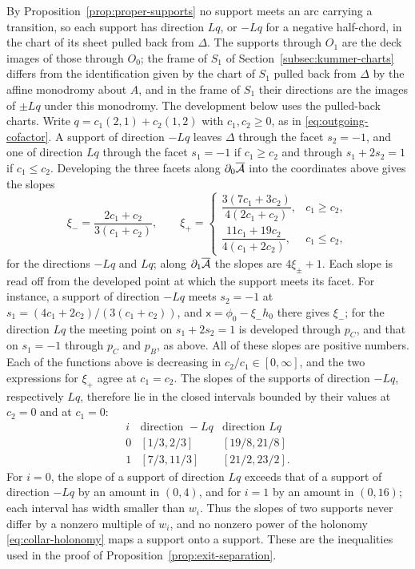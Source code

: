 By Proposition~\ref{prop:proper-supports} no support meets an arc carrying a
transition, so each support has direction $Lq$, or $-Lq$ for a negative
half-chord, in the chart of its sheet pulled back from $\Delta$.  The
supports through $O_1$ are the deck images of those through $O_0$; the frame
of $S_1$ of Section~\ref{subsec:kummer-charts} differs from the
identification given by the chart of $S_1$ pulled back from $\Delta$ by the
affine monodromy about $A$, and in the frame of $S_1$ their directions are
the images of $\pm Lq$ under this monodromy.  The
development below uses the pulled-back charts.  Write $q=c_1(2,1)+c_2(1,2)$ with
$c_1,c_2\geq0$, as in \eqref{eq:outgoing-cofactor}.  A support of
direction $-Lq$ leaves $\Delta$ through the facet $s_2=-1$, and one of
direction $Lq$ through the facet $s_1=-1$ if $c_1\geq c_2$ and through
$s_1+2s_2=1$ if $c_1\leq c_2$.  Developing the three facets along
$\partial_0\overline{\mathcal A}$ into the coordinates above gives the slopes
\[
 \xi_-=\frac{2c_1+c_2}{3(c_1+c_2)},
 \qquad
 \xi_+=
 \begin{cases}
 \dfrac{3(7c_1+3c_2)}{4(2c_1+c_2)},&c_1\geq c_2,\\[10pt]
 \dfrac{11c_1+19c_2}{4(c_1+2c_2)},&c_1\leq c_2,
 \end{cases}
\]
for the directions $-Lq$ and $Lq$; along $\partial_1\overline{\mathcal A}$ the
slopes are $4\xi_\pm+1$.  Each slope is read off from the developed point at
which the support meets its facet.  For instance, a support of direction
$-Lq$ meets $s_2=-1$ at $s_1=(4c_1+2c_2)/(3(c_1+c_2))$, and
$\mathsf x=\phi_0-\xi_-h_0$ there gives $\xi_-$; for the direction $Lq$ the
meeting point on $s_1+2s_2=1$ is developed through $p_C$, and that on
$s_1=-1$ through $p_C$ and $p_B$, as above.  All of these slopes are
positive numbers.  Each of
the functions above is decreasing in $c_2/c_1\in[0,\infty]$, and the two
expressions for $\xi_+$ agree at $c_1=c_2$.  The slopes of the supports of
direction $-Lq$, respectively $Lq$, therefore lie in the closed intervals
bounded by their values at $c_2=0$ and at $c_1=0$:
\begin{equation}\label{eq:slope-envelopes}
\begin{array}{c|c|c}
 i&\text{direction }-Lq&\text{direction }Lq\\ \hline
 0&[1/3,2/3]&[19/8,21/8]\\
 1&[7/3,11/3]&[21/2,23/2].
\end{array}
\end{equation}
For $i=0$, the slope of a support of direction $Lq$ exceeds that of a
support of direction $-Lq$ by an amount in $(0,4)$, and for $i=1$ by an
amount in $(0,16)$; each interval has width smaller
than $w_i$.  Thus the slopes of two supports never differ by a nonzero
multiple of $w_i$, and no nonzero power of the holonomy
\eqref{eq:collar-holonomy} maps a support onto a support.  These are the
inequalities used in the proof of
Proposition~\ref{prop:exit-separation}.

